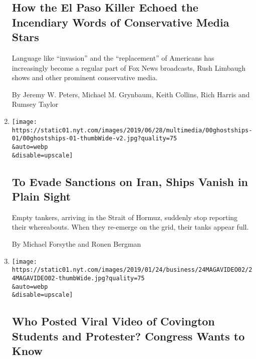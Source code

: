 \begin{enumerate}
  \hypertarget{how-the-el-paso-killer-echoed-the-incendiary-words-of-conservative-media-stars}{%
  \subsection{How the El Paso Killer Echoed the Incendiary Words of
  Conservative Media
  Stars}\label{how-the-el-paso-killer-echoed-the-incendiary-words-of-conservative-media-stars}}

  Language like ``invasion'' and the ``replacement'' of Americans has
  increasingly become a regular part of Fox News broadcasts, Rush
  Limbaugh shows and other prominent conservative media.

  By Jeremy W. Peters, Michael M. Grynbaum, Keith Collins, Rich Harris
  and Rumsey Taylor
\item
  \href{/2019/07/02/world/middleeast/china-oil-iran-sanctions.html}{}

  \texttt{[image: https://static01.nyt.com/images/2019/06/28/multimedia/00ghostships-01/00ghostships-01-thumbWide-v2.jpg?quality=75\\\&auto=webp\\\&disable=upscale]}

  \hypertarget{to-evade-sanctions-on-iran-ships-vanish-in-plain-sight}{%
  \subsection{To Evade Sanctions on Iran, Ships Vanish in Plain
  Sight}\label{to-evade-sanctions-on-iran-ships-vanish-in-plain-sight}}

  Empty tankers, arriving in the Strait of Hormuz, suddenly stop
  reporting their whereabouts. When they re-emerge on the grid, their
  tanks appear full.

  By Michael Forsythe and Ronen Bergman
\item
  \href{/2019/01/23/technology/covington-video-protester-congress.html}{}

  \texttt{[image: https://static01.nyt.com/images/2019/01/24/business/24MAGAVIDEO02/24MAGAVIDEO02-thumbWide.jpg?quality=75\\\&auto=webp\\\&disable=upscale]}

  \hypertarget{who-posted-viral-video-of-covington-students-and-protester-congress-wants-to-know}{%
  \subsection{Who Posted Viral Video of Covington Students and
  Protester? Congress Wants to
  Know}\label{who-posted-viral-video-of-covington-students-and-protester-congress-wants-to-know}}


\end{enumerate}
